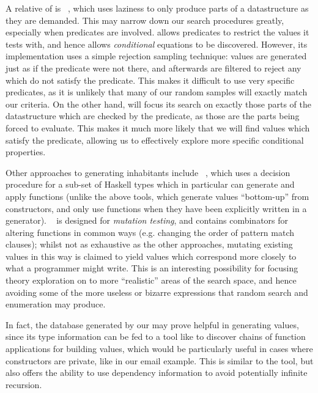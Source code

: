 A relative of \smallcheck{} is \lazysmallcheck{}~\cite{reich2013advances}, which
uses laziness to only produce parts of a datastructure as they are demanded.
This may narrow down our search procedures greatly, especially when predicates
are involved. \quickcheck{} allows predicates to restrict the values it tests
with, and hence allows \emph{conditional} equations to be discovered. However,
its implementation uses a simple rejection sampling technique: values are
generated just as if the predicate were not there, and afterwards are filtered
to reject any which do not satisfy the predicate. This makes it difficult to use
very specific predicates, as it is unlikely that many of our random samples will
exactly match our criteria. On the other hand, \lazysmallcheck{} will focus its
search on exactly those parts of the datastructure which are checked by the
predicate, as those are the parts being forced to evaluate. This makes it much
more likely that we will find values which satisfy the predicate, allowing us to
effectively explore more specific conditional properties.

Other approaches to generating inhabitants include
\djinn{}~\cite{augustsson2005djinn}, which uses a decision procedure for a sub-set of
Haskell types which in particular can generate and apply functions (unlike the
above tools, which generate values ``bottom-up'' from constructors, and only use
functions when they have been explicitly written in a
generator). \mucheck{}~\cite{le2014mucheck} is designed for
\emph{mutation testing}, and contains combinators for altering functions in
common ways (e.g. changing the order of pattern match clauses); whilst not as
exhaustive as the other approaches, mutating existing values in this way is
claimed to yield values which correspond more closely to what a programmer might
write. This is an interesting possibility for focusing theory exploration on to
more ``realistic'' areas of the search space, and hence avoiding some of the
more useless or bizarre expressions that random search and enumeration may
produce.

In fact, the database generated by our \astplugin{} may prove helpful in
generating values, since its type information can be fed to a tool like
\djinn{} to discover chains of function applications for building values,
which would be particularly useful in cases where constructors are private, like
in our email example. This is similar to the \hoogle{} tool, but also offers the
ability to use dependency information to avoid potentially infinite recursion.

